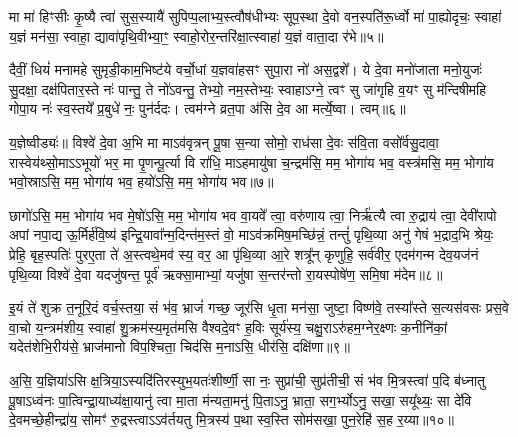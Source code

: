 मा मा॑ हिꣳसीः कृ॒ष्यै त्वा॑ सुस॒स्यायै॑ सुपिप्प॒लाभ्य॒स्त्वौष॑धीभ्यः सूप॒स्था दे॒वो वन॒स्पति॑रू॒र्ध्वो मा॑ पा॒ह्योदृचः॒ स्वाहा॑ य॒ज्ञं मन॑सा॒ स्वाहा॒ द्यावा॑पृथि॒वीभ्या॒ꣳ॒ स्वाहो॒रोर॒न्तरि॑क्षा॒त्स्वाहा॑ य॒ज्ञं वाता॒दा र॑भे॥५॥

{\anuvakamend[{मा॒ योनि॑रसि त्रि॒ꣳ॒शच्च॑॥२॥}]}

दैवीं॒ धियं॑ मनामहे सुमृडी॒काम॒भिष्ट॑ये वर्चो॒धां य॒ज्ञवा॑हसꣳ सुपा॒रा नो॑ अस॒द्वशे᳚। ये दे॒वा मनो॑जाता मनो॒युजः॑ सु॒दक्षा॒ दक्ष॑पितार॒स्ते नः॑ पान्तु॒ ते नो॑\-ऽवन्तु॒ तेभ्यो॒ नम॒स्तेभ्यः॒ स्वाहा\-ऽग्ने॒ त्वꣳ सु जा॑गृहि व॒यꣳ सु म॑न्दिषीमहि गोपा॒य नः॑ स्व॒स्तये᳚ प्र॒बुधे॑ नः॒ पुन॑र्ददः। त्वम॑ग्ने व्रत॒पा अ॑सि दे॒व आ मर्त्ये॒ष्वा। त्वम्॥६॥

य॒ज्ञेष्वीड्यः॑॥ विश्वे॑ दे॒वा अ॒भि मा मा\-ऽव॑वृत्रन् पू॒षा स॒न्या सोमो॒ राध॑सा दे॒वः स॑वि॒ता वसो᳚र्वसु॒दावा॒ रास्वेय॑थ्सो॒मा\-ऽ\-ऽभूयो॑ भर॒ मा पृ॒णन्पू॒र्त्या वि रा॑धि॒ मा\-ऽहमायु॑षा च॒न्द्रम॑सि॒ मम॒ भोगा॑य भव॒ वस्त्र॑मसि॒ मम॒ भोगा॑य भवो॒स्रा\-ऽसि॒ मम॒ भोगा॑य भव॒ हयो॑\-ऽसि॒ मम॒ भोगा॑य भव॥७॥

छागो॑\-ऽसि॒ मम॒ भोगा॑य भव मे॒षो॑\-ऽसि॒ मम॒ भोगा॑य भव वा॒यवे᳚ त्वा॒ वरु॑णाय त्वा॒ निर्ऋ॑त्यै त्वा रु॒द्राय॑ त्वा॒ देवी॑रापो अपां नपा॒द्य ऊ॒र्मिर्\mbox{}ह॑वि॒ष्य॑ इन्द्रि॒यावा᳚न्म॒दिन्त॑म॒स्तं वो॒ मा\-ऽव॑क्रमिष॒मच्छि॑न्नं॒ तन्तुं॑ पृथि॒व्या अनु॑ गेषं भ॒द्राद॒भि श्रेयः॒ प्रेहि॒ बृह॒स्पतिः॑ पुरए॒ता ते॑ अ॒स्त्वथे॒मव॑ स्य॒ वर॒ आ पृ॑थि॒व्या आ॒रे शत्रू᳚न् कृणुहि॒ सर्व॑वीर॒ एदम॑गन्म देव॒यज॑नं पृथि॒व्या विश्वे॑ दे॒वा यदजु॑षन्त॒ पूर्व॑ ऋक्सा॒माभ्यां॒ यजु॑षा स॒न्तर॑न्तो रा॒यस्पोषे॑ण॒ समि॒षा म॑देम॥८॥

{\anuvakamend[{आ त्वꣳ हयो॑\-ऽसि॒ मम॒ भोगा॑य भव स्य॒ पञ्च॑विꣳशतिश्च॥३॥}]}

इ॒यं ते॑ शुक्र त॒नूरि॒दं वर्च॒स्तया॒ सं भ॑व॒ भ्राजं॑ गच्छ॒ जूर॑सि धृ॒ता मन॑सा॒ जुष्टा॒ विष्ण॑वे॒ तस्या᳚स्ते स॒त्यस॑वसः प्रस॒वे वा॒चो य॒न्त्रम॑शीय॒ स्वाहा॑ शु॒क्रम॑स्य॒मृत॑मसि वैश्वदे॒वꣳ ह॒विः सूर्य॑स्य॒ चक्षु॒रा\-ऽरु॑हम॒ग्नेर॒क्ष्णः क॒नीनि॑कां॒ यदेत॑शेभि॒रीय॑से॒ भ्राज॑मानो विप॒श्चिता॒ चिद॑सि म॒ना\-ऽसि॒ धीर॑सि॒ दक्षि॑णा॥९॥

अ॒सि॒ य॒ज्ञिया॑\-ऽसि क्ष॒त्रिया॒\-ऽस्यदि॑तिरस्युभ॒यतः॑शीर्ष्णी॒ सा नः॒ सुप्रा॑ची॒ सुप्र॑तीची॒ सं भ॑व मि॒त्रस्त्वा॑ प॒दि ब॑ध्नातु पू॒षा\-ऽध्व॑नः पा॒त्विन्द्रा॒याध्य॑क्षा॒यानु॑ त्वा मा॒ता म॑न्यता॒मनु॑ पि॒ता\-ऽनु॒ भ्राता॒ सग॒र्भ्यो\-ऽनु॒ सखा॒ सयू᳚थ्यः॒ सा दे॑वि दे॒वमच्छे॒हीन्द्रा॑य॒ सोमꣳ॑ रु॒द्रस्त्वा\-ऽ\-ऽव॑र्तयतु मि॒त्रस्य॑ प॒था स्व॒स्ति सोम॑सखा॒ पुन॒रेहि॑ स॒ह र॒य्या॥१०॥

{\anuvakamend[{दक्षि॑णा॒ सोम॑सखा॒ पञ्च॑ च॥४॥}]}

